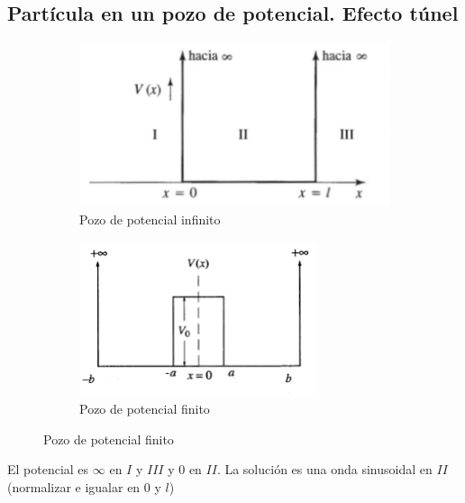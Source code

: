 \documentclass[12pt]{article}
\begin{document}
	\subsection{Partícula en un pozo de potencial. Efecto túnel}
		\begin{figure}[h!]
\centering
\begin{subfigure}[b]{0.45\linewidth}
\includegraphics[width=\linewidth]{Pozo_potencial_infinito}
\caption{Pozo de potencial infinito}
\label{fig:westminster_lateral}
\end{subfigure}
\begin{subfigure}[b]{0.45\linewidth}
\includegraphics[width=\linewidth]{Pozo_potencial_finito}
\caption{Pozo de potencial finito}
\label{fig:westminster_aerea}
\end{subfigure}
\label{fig:westminster}
\end{figure}
El potencial es $\infty$ en $I$ y $III$ y $0$ en $II$. La solución es una onda sinusoidal en $II$ (normalizar e igualar en $0$ y $l$) \\
\end{document}
